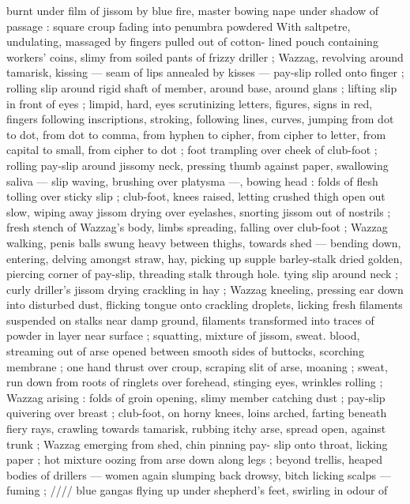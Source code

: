 burnt under film of jissom by blue fire, master bowing nape under 
shadow of passage : square croup fading into penumbra powdered 
With saltpetre, undulating, massaged by fingers pulled out of cotton- 
lined pouch containing workers' coins, slimy from soiled pants of 
frizzy driller ; Wazzag, revolving around tamarisk, kissing --- seam of 
lips annealed by kisses --- pay-slip rolled onto finger ; rolling slip 
around rigid shaft of member, around base, around glans ; lifting slip 
in front of eyes ; limpid, hard, eyes scrutinizing letters, figures, signs 
in red, fingers following inscriptions, stroking, following lines, 
curves, jumping from dot to dot, from dot to comma, from hyphen to 
cipher, from cipher to letter, from capital to small, from cipher to dot 
; foot trampling over cheek of club-foot ; rolling pay-slip around 
jissomy neck, pressing thumb against paper, swallowing saliva --- 
slip waving, brushing over platysma ---, bowing head : folds of flesh 
tolling over sticky slip ; club-foot, knees raised, letting crushed thigh 
open out slow, wiping away jissom drying over eyelashes, snorting 
jissom out of nostrils ; fresh stench of Wazzag's body, limbs 
spreading, falling over club-foot ; Wazzag walking, penis balls swung 
heavy between thighs, towards shed --- bending down, entering, 
delving amongst straw, hay, picking up supple barley-stalk dried 
golden, piercing corner of pay-slip, threading stalk through hole. 
tying slip around neck ; curly driller's jissom drying crackling in hay 
; Wazzag kneeling, pressing ear down into disturbed dust, flicking 
tongue onto crackling droplets, licking fresh filaments suspended on 
stalks near damp ground, filaments transformed into traces of 
powder in layer near surface ; squatting, mixture of jissom, sweat. 
blood, streaming out of arse opened between smooth sides of 
buttocks, scorching membrane ; one hand thrust over croup, scraping 
slit of arse, moaning ; sweat, run down from roots of ringlets over 
forehead, stinging eyes, wrinkles rolling ; Wazzag arising : folds of 
groin opening, slimy member catching dust ; pay-slip quivering over 
breast ; club-foot, on horny knees, loins arched, farting beneath 
fiery rays, crawling towards tamarisk, rubbing itchy arse, spread 
open, against trunk ; Wazzag emerging from shed, chin pinning pay- 
slip onto throat, licking paper ; hot mixture oozing from arse down 
along legs ; beyond trellis, heaped bodies of drillers --- women 
again slumping back drowsy, bitch licking scalps --- fuming ; {\slash}{\slash}{\slash}{\slash} blue 
gangas flying up under shepherd's feet, swirling in odour of 
